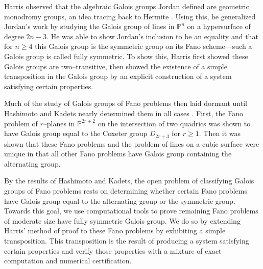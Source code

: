 \documentclass[12pt]{amsart}
\theoremstyle{definition}
\begin{document}
Harris observed that the algebraic Galois groups Jordan defined are geometric monodromy groups, an idea tracing back to Hermite \cite{Hermite}. Using this, he generalized Jordan's work by studying the Galois group of lines in $\mathbb{P}^n$ on a hypersurface of degree $2n-3$. He was able to show Jordan's inclusion to be an equality and that for $n\ge 4$ this Galois group is the symmetric group on its Fano scheme---such a Galois group is called fully symmetric. To show this, Harris first showed these Galois groups are two--transitive, then showed the existence of a simple transposition in the Galois group by an explicit construction of a system satisfying certain properties.

Much of the study of Galois groups of Fano problems then laid dormant until Hashimoto and Kadets nearly determined them in all cases \cite{HK}. First, the Fano problem of $r$--planes in $\mathbb{P}^{2r+2}$ on the intersection of two quadrics was shown to have Galois group equal to the Coxeter group $D_{2r+3}$ for $r\ge 1$. Then it was shown that these Fano problems and the problem of lines on a cubic surface were unique in that all other Fano problems have Galois group containing the alternating group.

By the results of Hashimoto and Kadets, the open problem of classifying Galois groups of Fano problems rests on determining whether certain Fano problems have Galois group equal to the alternating group or the symmetric group. Towards this goal, we use computational tools to prove remaining Fano problems of moderate size have fully symmetric Galois group. We do so by extending Harris' method of proof to these Fano problems by exhibiting a simple transposition. This transposition is the result of producing a system satisfying certain properties and verify those properties with a mixture of exact computation and numerical certification. 
\end{document}
